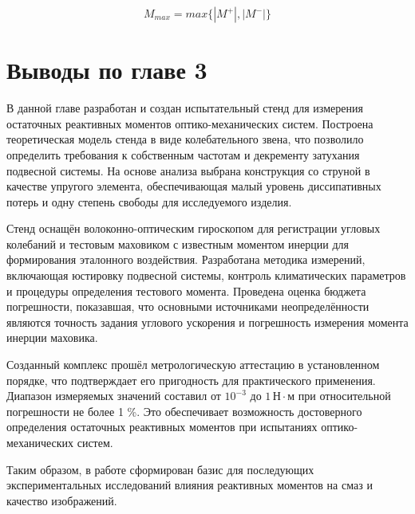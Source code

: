 \begin{equation}
	\label{eq:Mom}
	M_{max} = max\{|M^+|, |M^-|\}
\end{equation}






\section*{Выводы по главе 3}

В данной главе разработан и создан испытательный стенд для измерения остаточных реактивных моментов оптико-механических систем.  
Построена теоретическая модель стенда в виде колебательного звена, что позволило определить требования к собственным частотам и декременту затухания подвесной системы. На основе анализа выбрана конструкция со струной в качестве упругого элемента, обеспечивающая малый уровень диссипативных потерь и одну степень свободы для исследуемого изделия.

Стенд оснащён волоконно-оптическим гироскопом для регистрации угловых колебаний и тестовым маховиком с известным моментом инерции для формирования эталонного воздействия. Разработана методика измерений, включающая юстировку подвесной системы, контроль климатических параметров и процедуры определения тестового момента. Проведена оценка бюджета погрешности, показавшая, что основными источниками неопределённости являются точность задания углового ускорения и погрешность измерения момента инерции маховика.

Созданный комплекс прошёл метрологическую аттестацию в установленном порядке, что подтверждает его пригодность для практического применения. Диапазон измеряемых значений составил от $10^{-3}$ до $1 \,\text{Н}\cdot\text{м}$ при относительной погрешности не более 1 \%. Это обеспечивает возможность достоверного определения остаточных реактивных моментов при испытаниях оптико-механических систем.

Таким образом, в работе сформирован базис для последующих экспериментальных исследований влияния реактивных моментов на смаз и качество изображений. 



\clearpage
\FloatBarrier